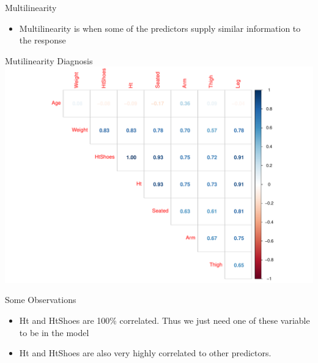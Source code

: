 \documentclass[
  ignorenonframetext,
]{beamer}
\providecommand{\tightlist}{%
  \setlength{\itemsep}{0pt}\setlength{\parskip}{0pt}}\usepackage{longtable,booktabs,array}
\begin{document}
\begin{frame}{Multilinearity}
\protect\hypertarget{multilinearity}{}
\begin{itemize}
\tightlist
\item
  Multilinearity is when some of the predictors supply similar
  information to the response
\end{itemize}
\end{frame}

\begin{frame}{Mutilinearity Diagnosis}
\protect\hypertarget{mutilinearity-diagnosis}{}
\includegraphics{2_1_files/figure-beamer/unnamed-chunk-12-1.pdf}
\end{frame}

\begin{frame}{Some Observations}
\protect\hypertarget{some-observations}{}
\begin{itemize}
\item
  Ht and HtShoes are 100\% correlated. Thus we just need one of these
  variable to be in the model
\item
  Ht and HtShoes are also very highly correlated to other predictors.
\end{itemize}
\end{frame}
\end{document}
